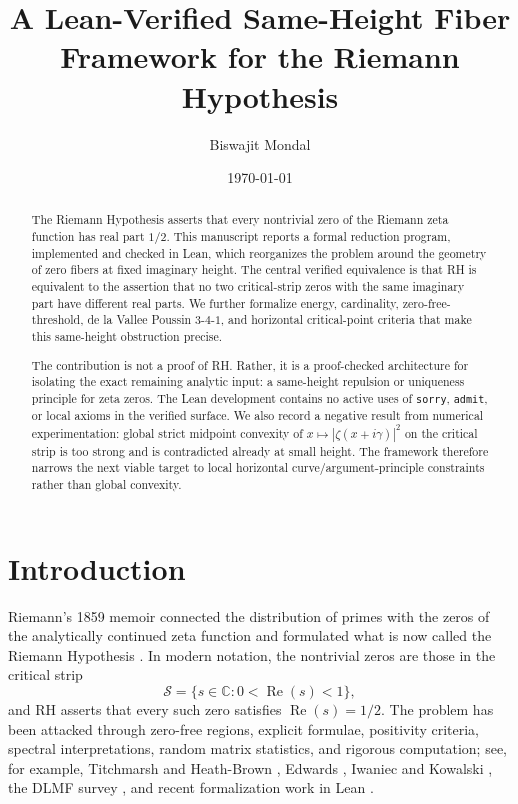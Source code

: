 \documentclass[11pt]{amsart}
\title[Same-height fiber reductions for RH]{A Lean-Verified Same-Height Fiber Framework for the Riemann Hypothesis}
\author{Biswajit Mondal}
\date{\today}
\newcommand{\C}{\mathbb{C}}
\newcommand{\re}{\operatorname{Re}}
\newcommand{\crit}{\mathcal{S}}
\newcommand{\lean}[1]{\texttt{#1}}
\begin{document}
\begin{abstract}
The Riemann Hypothesis asserts that every nontrivial zero of the Riemann zeta
function has real part \(1/2\).  This manuscript reports a formal reduction
program, implemented and checked in Lean, which reorganizes the problem around
the geometry of zero fibers at fixed imaginary height.  The central verified
equivalence is that RH is equivalent to the assertion that no two critical-strip
zeros with the same imaginary part have different real parts.  We further
formalize energy, cardinality, zero-free-threshold, de la Vallee Poussin
\(3\)-\(4\)-\(1\), and horizontal critical-point criteria that make this
same-height obstruction precise.

The contribution is not a proof of RH.  Rather, it is a proof-checked
architecture for isolating the exact remaining analytic input: a same-height
repulsion or uniqueness principle for zeta zeros.  The Lean development contains
no active uses of \lean{sorry}, \lean{admit}, or local axioms in the verified
surface.  We also record a negative result from numerical experimentation:
global strict midpoint convexity of \(x\mapsto |\zeta(x+i\gamma)|^2\) on the
critical strip is too strong and is contradicted already at small height.  The
framework therefore narrows the next viable target to local horizontal
curve/argument-principle constraints rather than global convexity.
\end{abstract}

\maketitle

\section{Introduction}

Riemann's 1859 memoir connected the distribution of primes with the zeros of
the analytically continued zeta function and formulated what is now called the
Riemann Hypothesis \cite{Riemann1859}.  In modern notation, the nontrivial zeros
are those in the critical strip
\[
  \crit=\{s\in\C:0<\re(s)<1\},
\]
and RH asserts that every such zero satisfies \(\re(s)=1/2\).  The problem has
been attacked through zero-free regions, explicit formulae, positivity
criteria, spectral interpretations, random matrix statistics, and rigorous
computation; see, for example, Titchmarsh and Heath-Brown \cite{Titchmarsh1986},
Edwards \cite{Edwards1974}, Iwaniec and Kowalski \cite{IwaniecKowalski2004},
the DLMF survey \cite{DLMFZetaZeros}, and recent formalization work in Lean
\cite{LoefflerStoll2025}.
\end{document}
